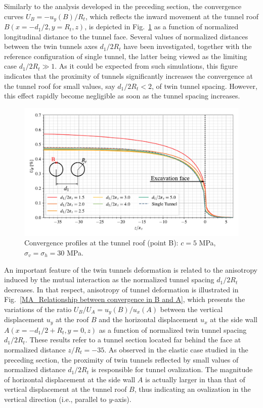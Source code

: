 \documentclass[Journal,letterpaper, NoLists,SectionNumbers]{ascelike-new}
\begin{document}
Similarly to the analysis developed in the preceding section, the convergence curves $U_B=-u_y(B)/R_t$, which reflects the inward movement at the tunnel roof $B(x=-d_1/2, y=R_t, z)$, is depicted in Fig.~\ref{MA_convergence_profile_B} as a function of normalized longitudinal distance to the tunnel face. Several values of normalized distances between the twin tunnels axes $d_1/2R_t$ have been investigated, together with the reference configuration of single tunnel, the latter being viewed as the limiting case $d_1/2R_t \gg 1$. As it could be expected from such simulations, this figure indicates that the proximity of tunnels significantly increases the convergence at the tunnel roof for small values, say $d_1/2R_t < 2$, of twin tunnel spacing. However, this effect rapidly become negligible as soon as the tunnel spacing increases.

\begin{figure}[h!]
	\centering
	\includegraphics[scale=0.65]{MA_Convergence Profiles in B.pdf}
	\caption{Convergence profiles at the tunnel roof (point B): $c=5$ MPa, $\sigma_v = \sigma_h = 30$ MPa.}
	\label{MA_convergence_profile_B}
\end{figure}

An important feature of the twin tunnels deformation is related to the anisotropy induced by the mutual interaction as the normalized tunnel spacing $d_1/2R_t$ decreases. In that respect, anisotropy of tunnel deformation is illustrated in Fig.~\ref{MA_Relationship between convergence in B and A}, which presents the variations of the ratio $U_B/U_A = u_y(B)/u_x(A)$ between the vertical displacement $u_y$ at the roof $B$ and the horizontal displacement $u_x$ at the side wall $A(x =-d_1/2+R_t, y = 0, z)$ as a function of  normalized twin tunnel spacing $d_1/2R_t$. These results refer to a tunnel section located far behind the face at normalized distance $z/R_t = -35$. As observed in the elastic case studied in the preceding section, the proximity of twin tunnels reflected by small values of normalized distance $d_1/2R_t$ is responsible for tunnel ovalization. The magnitude of horizontal displacement at the side wall $A$ is actually larger in than that of vertical displacement at the tunnel roof $B$, thus indicating an ovalization in the vertical direction (i.e., parallel to $y$-axis).
\end{document}
